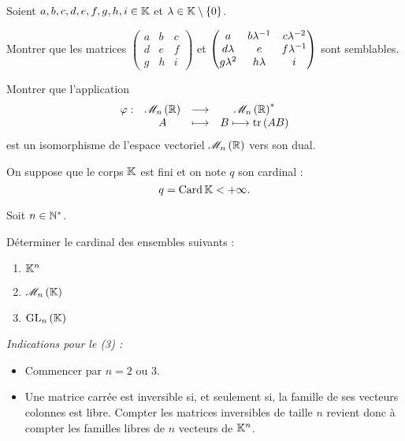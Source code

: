 \begin{corr}
\end{corr}

\begin{exo}[Exercice 9]
Soient \(a,b,c,d,e,f,g,h,i\in\mathbb{K}\) et \(\lambda\in\mathbb{K}\setminus\left\lbrace0\right\rbrace\).

Montrer que les matrices \(\begin{pmatrix}
a & b & c \\
d & e & f \\
g & h & i
\end{pmatrix}\) et \(\begin{pmatrix}
a & b\lambda^{-1} & c\lambda^{-2} \\
d\lambda & e & f\lambda^{-1} \\
g\lambda^2 & h\lambda & i
\end{pmatrix}\) sont semblables.
\end{exo}

\begin{corr}
\end{corr}

\begin{exo}[Exercice 10]
Montrer que l'application \[\fonction{\phi}{\M{n}[\R]}{\M{n}[\R]\etoile}{A}{B\mapsto\tr\paren{AB}}\] est un isomorphisme de l'espace vectoriel \(\M{n}[\R]\) vers son dual.
\end{exo}

\begin{corr}
\end{corr}

\begin{exo}[Exercice 11]
On suppose que le corps \(\mathbb{K}\) est fini et on note \(q\) son cardinal : \[q=\operatorname{Card}\mathbb{K}<+\infty.\]

Soit \(n\in\mathbb{N}^*\).

Déterminer le cardinal des ensembles suivants :

\begin{enumerate}
\item \(\mathbb{K}^n\) \\

\item \(\M{n}\) \\

\item \(\GL{n}\)
\end{enumerate}

\textit{Indications pour le (3) :}

\begin{itemize}
\item Commencer par \(n=2\) ou \(3\). \\

\item Une matrice carrée est inversible si, et seulement si, la famille de ses vecteurs colonnes est libre. Compter les matrices inversibles de taille \(n\) revient donc à compter les familles libres de \(n\) vecteurs de \(\mathbb{K}^n\).
\end{itemize}
\end{exo}

